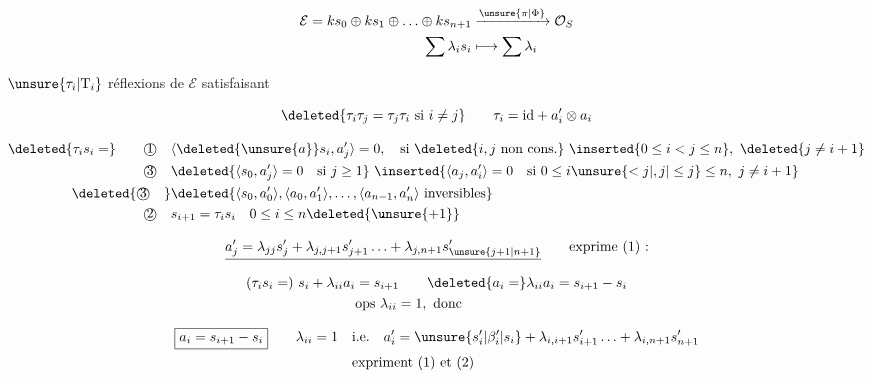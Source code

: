 \[
\begin{aligned}
\mathcal E=k s_0\oplus k s_1\oplus\ldots\oplus k s_{n+1}&\xrightarrow{\unsure{\pi|\Phi}}\mathcal O_S\\
\sum\lambda_i s_i&\longmapsto\sum\lambda_i
\end{aligned}
\]

$\unsure{\tau_i|\mathrm T_i}$ réflexions de $\mathcal E$  satisfaisant

\[
\deleted{\tau_i\tau_j=\tau_j\tau_i\ \text{si }i\ne j}\qquad \tau_i=\mathrm{id}+a'_i\otimes a_i
\]

\[
\begin{aligned}
\deleted{\tau_i s_i=}\qquad\text{\textcircled{1}}\quad&
 \langle\deleted{\unsure{a}}s_i,a'_j\rangle=0,\quad\text{si }\deleted{i,j\ \text{non cons.}}\ \inserted{0\leq i<j\leq n},\ \deleted{j\ne i+1}\\
\text{\textcircled{3}}\quad&
 \deleted{\langle s_0,a'_j\rangle=0\quad\text{si }j\geq1}\ 
 \inserted{\langle a_j,a'_i\rangle=0\quad\text{si }0\leq i\unsure{<j|,j|\leq j}\leq n,\ j\ne i+1}\\
\deleted{\text{\textcircled{3}}\quad}&
\deleted{\langle s_0,a'_0\rangle,\langle a_0,a'_1\rangle,\ldots,\langle a_{n-1},a'_n\rangle\ \text{inversibles}}\\
\text{\textcircled{2}}\quad& s_{i+1}=\tau_i s_i\quad0\leq i\leq n\deleted{\unsure{+1}}
\end{aligned}
\]


\[
\underline{a'_j=\lambda_{jj}s'_j+\lambda_{j,j+1}s'_{j+1}\ldots+\lambda_{j,n+1}s'_{\unsure{j+1|n+1}}}\qquad\text{exprime (1) :}
\]

\[
\begin{aligned}
(\tau_i s_i=)\ s_i+\lambda_{ii}a_i&=s_{i+1}\qquad\deleted{a_i=}\lambda_{ii}a_i=s_{i+1}-s_i\\
&\text{ops }\lambda_{ii}=1,\ \text{donc}
\end{aligned}
\]

\[
\begin{aligned}
\boxed{a_i=s_{i+1}-s_i}\qquad\lambda_{ii}=1\quad &\text{i.e.}\quad a'_i=\unsure{s'_i|\beta'_i|s_i}+\lambda_{i,i+1}s'_{i+1}\ldots+\lambda_{i,n+1}s'_{n+1}\\
&\text{expriment (1) et (2)}
\end{aligned}
\]

